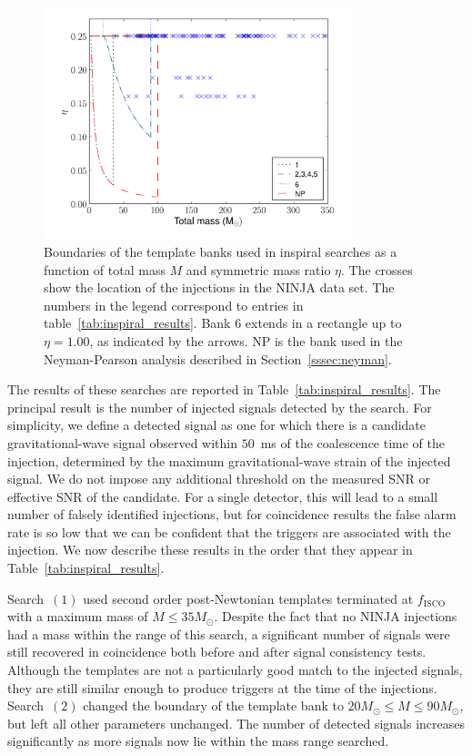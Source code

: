 \begin{figure}
  \begin{center}
  \includegraphics[width=0.8\textwidth]{figures/ninja1/ninja_banks}
  \end{center}
  \caption[Boundaries of template banks in NINJA1 inspiral searches]{
\label{f:ninjaBanks}
Boundaries of the template banks used in inspiral searches as a
function of total mass $M$ and symmetric mass ratio $\eta$. The crosses show
the location of the injections in the NINJA data set. The numbers in the
legend correspond to entries in table~\ref{tab:inspiral_results}. Bank 6
extends in a rectangle up to $\eta = 1.00$, as indicated by the arrows. NP
is the bank used in the Neyman-Pearson analysis described in 
Section~\ref{sssec:neyman}.}
\end{figure}

The results of these searches are reported in
Table~\ref{tab:inspiral_results}.  The principal result is the number
of injected signals detected by the search.  For simplicity, we define
a detected signal as one for which there is a candidate
gravitational-wave signal observed within $50$~ms of the coalescence
time of the injection, determined by the maximum gravitational-wave
strain of the injected signal.  We do not impose any additional
threshold on the measured SNR or effective SNR of the candidate.  For
a single detector, this will lead to a small number of falsely
identified injections, but for coincidence results the false alarm
rate is so low that we can be confident that the triggers are
associated with the injection. We now describe these results in the
order that they appear in Table~\ref{tab:inspiral_results}.

Search~$(1)$ used second order post-Newtonian templates terminated at
$f_\mathrm{ISCO}$ with a maximum mass of $M \le 35 M_{\odot}$.
Despite the fact that no NINJA injections had a mass within the range
of this search, a significant number of signals were still recovered
in coincidence both before and after signal consistency tests.
Although the templates are not a particularly good match to the
injected signals, they are still similar enough to produce triggers at
the time of the injections.  Search~$(2)$ changed the boundary of the
template bank to $20 M_\odot \le M \le 90 M_{\odot}$, but left all
other parameters unchanged.  The number of detected signals increases
significantly as more signals now lie within the mass range searched. 

